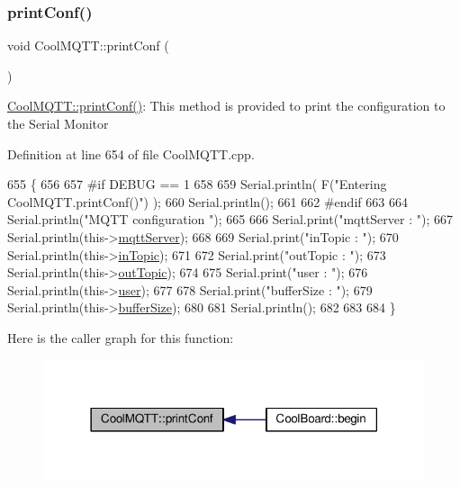 \subsubsection{\texorpdfstring{print\+Conf()}{printConf()}}
{\footnotesize\ttfamily void Cool\+M\+Q\+T\+T\+::print\+Conf (\begin{DoxyParamCaption}{ }\end{DoxyParamCaption})}

\hyperlink{class_cool_m_q_t_t_a40553a0ad4b5ecf1cb4411ab54ca85fb}{Cool\+M\+Q\+T\+T\+::print\+Conf()}\+: This method is provided to print the configuration to the Serial Monitor 

Definition at line 654 of file Cool\+M\+Q\+T\+T.\+cpp.


\begin{DoxyCode}
655 \{
656 
657 \textcolor{preprocessor}{#if DEBUG == 1 }
658 
659     Serial.println( F(\textcolor{stringliteral}{"Entering CoolMQTT.printConf()"}) );
660     Serial.println();   
661 
662 \textcolor{preprocessor}{#endif}
663     
664     Serial.println(\textcolor{stringliteral}{"MQTT configuration "});
665 
666     Serial.print(\textcolor{stringliteral}{"mqttServer : "});
667     Serial.println(this->\hyperlink{class_cool_m_q_t_t_ab8bb951f87ddbf92db74c2ad16a3e53e}{mqttServer});
668 
669     Serial.print(\textcolor{stringliteral}{"inTopic : "});
670     Serial.println(this->\hyperlink{class_cool_m_q_t_t_a4492f52a441e83cc5151010317fdb52d}{inTopic});
671 
672     Serial.print(\textcolor{stringliteral}{"outTopic : "});
673     Serial.println(this->\hyperlink{class_cool_m_q_t_t_a109c786a17b463f9eeba046194279522}{outTopic});
674 
675     Serial.print(\textcolor{stringliteral}{"user : "});
676     Serial.println(this->\hyperlink{class_cool_m_q_t_t_a8cd47e45d457f908d4b4390b35aaee83}{user});
677 
678     Serial.print(\textcolor{stringliteral}{"bufferSize : "});
679     Serial.println(this->\hyperlink{class_cool_m_q_t_t_a7f3cf26b51d6770f216e42c5ef13ca9f}{bufferSize});
680 
681     Serial.println();
682 
683 
684 \}
\end{DoxyCode}
Here is the caller graph for this function\+:\nopagebreak
\begin{figure}[H]
\begin{center}
\leavevmode
\includegraphics[width=318pt]{d0/dd0/class_cool_m_q_t_t_a40553a0ad4b5ecf1cb4411ab54ca85fb_icgraph}
\end{center}
\end{figure}
\mbox{\label{class_cool_m_q_t_t_ace977b3e90ab14b1199fe5c4fb0a13ec}} 
